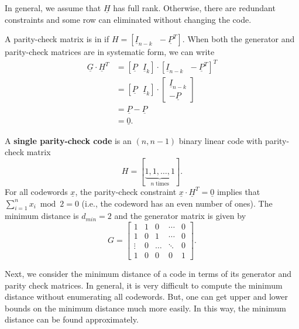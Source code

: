 In general, we assume that $\underline{H}$ has full rank.
Otherwise, there are redundant constraints and some row can eliminated without changing the code.

A parity-check matrix is in  if $H=\left[\underline{I}_{n-k}\,\,\,\,-\underline{P}^{T}\right]$.
When both the generator and parity-check matrices are in systematic form, we can write
\begin{align*}
\underline{G}\cdot\underline{H}^{T}
&=\left[\underline{P}\,\,\,\,\underline{I}_{k}\right]\cdot\left[\underline{I}_{n-k}\,\,\,\,-\underline{P}^{T}\right]^{T} \\
&=\left[\underline{P}\,\,\,\,\underline{I}_{k}\right]\cdot \left[ \begin{array}{c} \underline{I}_{n-k} \\ -\underline{P} \end{array} \right] \\
&=\underline{P}-\underline{P} \\
&=\underline{0}.
\end{align*}

\begin{example}
A \textbf{single parity-check code} is an $(n,n-1)$ binary linear code with parity-check matrix
\[ H=[\underbrace{1,1,\ldots,1}_{n\;\mathrm{times}}]. \]
For all codewords $\underline{x}$, the parity-check constraint $\underline{x}\cdot\underline{H}^{T}=\underline{0}$ implies that $\sum_{i=1}^{n}x_{i}\bmod2=0$ (i.e., the codeword has an even number of ones).
The minimum distance is $d_{min} = 2$ and the generator matrix is given by
\begin{equation*}
G=\left[\begin{array}{ccccc} 1 & 1 & 0 & \cdots & 0 \\ 1 & 0 & 1 & \cdots & 0 \\ \vdots & 0 & \ldots & \ddots & 0 \\ 1 & 0 & 0 & 0 & 1 \end{array}\right].
\end{equation*}
\end{example}

Next, we consider the minimum distance of a code in terms of its generator and parity check matrices.
In general, it is very difficult to compute the minimum distance without enumerating all codewords.
But, one can get upper and lower bounds on the minimum distance much more easily.
In this way, the minimum distance can be found approximately.

